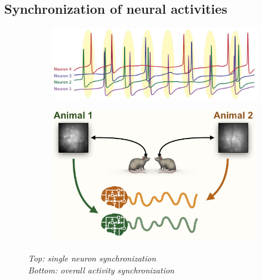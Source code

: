 \documentclass[12pt, a4paper]{article}
\begin{document}
\subsection{Synchronization of neural activities} \label{section 1.5}

\begin{figure}[H]
	\begin{minipage}{\linewidth}
		\centering
		\begin{minipage}{0.6\linewidth}
			\begin{figure}[H]
				\includegraphics[width=\linewidth]{synch.png}
				
			\end{figure}
		\end{minipage}
		\hspace{0.05\linewidth}
		\begin{minipage}{0.6\linewidth}
			\begin{figure}[H]
				\includegraphics[width=\linewidth]{Intebrain.png}
				
			\end{figure}
		\end{minipage}
		
	\end{minipage}
\caption{\textit{Top: single neuron synchronization \\
		Bottom: overall activity synchronization}} \label{synch}
\end{figure}
\end{document}
